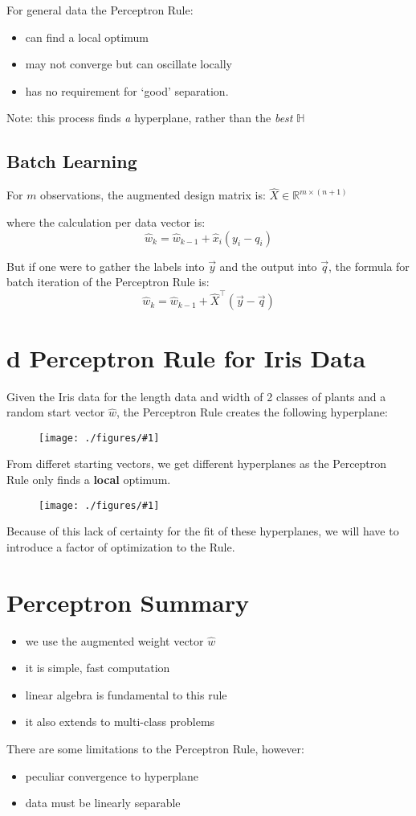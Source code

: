 \documentclass[12pt]{book}
\newcommand{\incimg}[2]{%
       \begin{figure}[h]
               \centering
               \texttt{[image: ./figures/\#1]}
       \end{figure}
}
\begin{document}
For general data the Perceptron Rule:
\begin{itemize}
        \item can find a local optimum
        \item may not converge but can oscillate locally
        \item has no requirement for `good' separation.
\end{itemize}

Note: this process finds \textit{a} hyperplane, rather than the \textit{best}
$\mathbb{H}$

\subsection*{Batch Learning}
For $m$ observations, the augmented design matrix is: $\hat X \in \mathbb{R}^{m \times (n + 1)}$

where the calculation per data vector is:
\[\hat w_k = \hat w_{k-1} + \hat x_i(y_i - q_i)\]

But if one were to gather the labels into $\vec y$ and the output into
$\vec q$, the formula for batch iteration of the Perceptron Rule is:
\[\hat w_k = \hat w_{k-1} + \hat X^\top(\vec y - \vec q)\]

\section*{d Perceptron Rule for Iris Data}
Given the Iris data for the length data and width of 2 classes of plants and 
a random start vector $\hat w$, the Perceptron Rule creates the following
hyperplane:
\incimg{iris1}{0.5}

From differet starting vectors, we get different hyperplanes as the Perceptron
Rule only finds a \textbf{local} optimum.
\incimg{iris2}{0.5}

Because of this lack of certainty for the fit of these hyperplanes, we will
have to introduce a factor of optimization to the Rule.

\section*{Perceptron Summary}
\begin{itemize}
        \item we use the augmented weight vector $\hat w$
        \item it is simple, fast computation
        \item linear algebra is fundamental to this rule
        \item it also extends to multi-class problems
\end{itemize}
There are some limitations to the Perceptron Rule, however:
\begin{itemize}
        \item peculiar convergence to hyperplane
        \item data must be linearly separable
\end{itemize}
\end{document}

